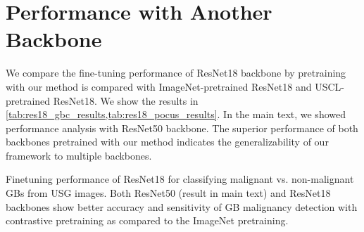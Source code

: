 \documentclass[runningheads]{llncs}
\begin{document}
\section{Performance with Another Backbone}
We compare the fine-tuning performance of ResNet18 backbone by pretraining with our method is compared with ImageNet-pretrained ResNet18 and USCL-pretrained ResNet18. We show the results in \cref{tab:res18_gbc_results,tab:res18_pocus_results}. In the main text, we showed performance analysis with ResNet50 backbone. The superior performance of both backbones pretrained with our method indicates the generalizability of our framework to multiple backbones.
\begin{table}[!t]
    \parbox{\linewidth}{
    	\centering
    	\setlength{\tabcolsep}{10pt}
    	\caption{Finetuning performance of ResNet18 for classifying malignant vs. non-malignant GBs from USG images. Both ResNet50 (result in main text) and ResNet18 backbones show better accuracy and sensitivity of GB malignancy detection with contrastive pretraining as compared to the ImageNet pretraining.}
    	\label{tab:res18_gbc_results}
    }
    \vspace{2em}
    
    \parbox{\linewidth}{
        \centering
    	\setlength{\tabcolsep}{10pt}
    	\caption{Comparison of finetuning performance of ResNet18 using the SOTA USCL, ImageNet pretraining, and our method on POCUS. The pretraining was done on Butterfly dataset.}
    	\label{tab:res18_pocus_results}
	}
\end{table}
\end{document}
